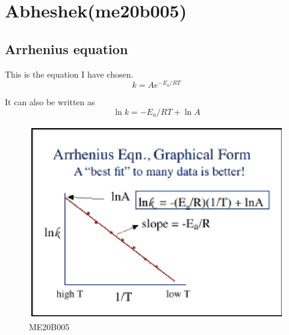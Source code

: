 %





\section{Abheshek(me20b005)}
\subsection{Arrhenius equation}
This is the equation I have chosen.
\begin{equation}
	k = Ae^{-E_a/RT}
	\label{eqn:arrhenius}
\end{equation}

It can also be written as
\begin{equation}
	\ln{k} = -E_a/RT + \ln{A}
	\label{eqn2:arrhenius}	
\end{equation}

\begin{figure}[h]
	\begin{center}
		\includegraphics[scale=0.75]{me20b005/arrhenius.eps}
	\end{center}
	\caption{ME20B005}
	\label{f1:graph}
\end{figure}

